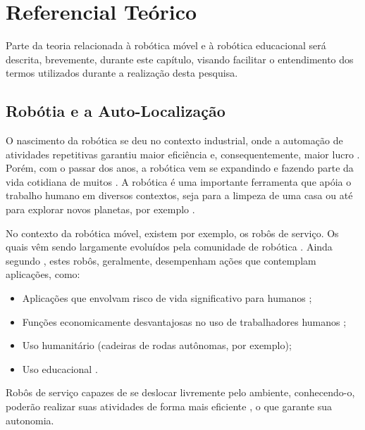 
\chapter[Referencial Teórico]{Referencial Teórico}
	
	Parte da teoria relacionada à robótica móvel e à robótica educacional será descrita, brevemente, durante este capítulo, visando facilitar o entendimento dos termos utilizados durante a realização desta pesquisa. 

\section{Robótia e a Auto-Localização}

O nascimento da robótica se deu no contexto industrial, onde a automação de atividades repetitivas garantiu maior eficiência e, consequentemente, maior lucro \cite{roboticaIndustrial}. Porém, com o passar dos anos, a robótica vem se expandindo e fazendo parte da vida cotidiana de muitos \cite{teachingWithRoboticKit}. A robótica é uma importante ferramenta que apóia o trabalho humano em diversos contextos, seja para a limpeza de uma casa \cite{melhoramentoServicoLimpeza} ou até para explorar novos planetas, por exemplo \sloppy \cite{explore_marte}.

No contexto da robótica móvel, existem por exemplo, os robôs de serviço. Os quais vêm sendo largamente evoluídos pela comunidade de robótica \cite{theCleaningProject}. Ainda segundo \cite{theCleaningProject}, estes robôs, geralmente, desempenham ações que contemplam aplicações, como:

\begin{itemize}
	\item Aplicações que envolvam risco de vida significativo para humanos \cite{explore_marte};
	\item Funções economicamente desvantajosas no uso de trabalhadores humanos \cite{roboticaIndustrial};
	\item Uso humanitário (cadeiras de rodas autônomas, por exemplo);
	\item Uso educacional \cite{teachingToolsState-Art}.
\end{itemize} 

Robôs de serviço capazes de se deslocar livremente pelo ambiente, conhecendo-o, poderão realizar suas atividades de forma mais eficiente \cite{theCleaningProject}, o que garante sua autonomia.

